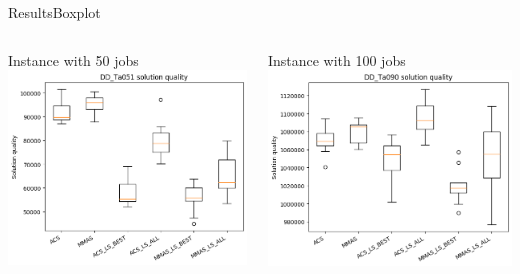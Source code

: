 \documentclass[10pt]{beamer}
\begin{document}
\begin{frame}{Results}{Boxplot}
    \begin{columns}[T]
     \begin{column}{.5\textwidth}
         \begin{block}{Instance with 50 jobs}
         \includegraphics[scale=0.3]{plots/DD_Ta051__boxplot}
         \end{block}
       \end{column}
       \begin{column}{.5\textwidth}
         \begin{block}{Instance with 100 jobs}
         \includegraphics[scale=0.3]{plots/DD_Ta090__boxplot}
         \end{block}
       \end{column}
   \end{columns}
\end{frame}
\end{document}
